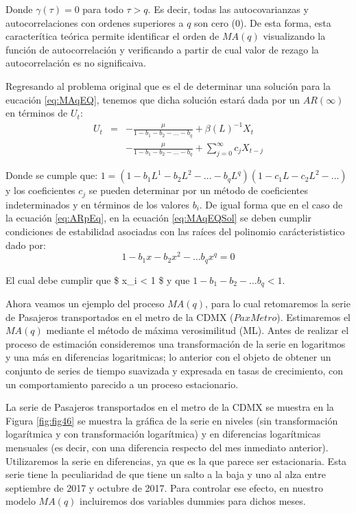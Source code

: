 \documentclass[
]{book}
\begin{document}
Donde \(\gamma(\tau) = 0\) para todo \(\tau > q\). Es decir, todas las autocovarianzas y autocorrelaciones con ordenes superiores a \(q\) son cero (0). De esta forma, esta caracterítica teórica permite identificar el orden de \(MA(q)\) visualizando la función de autocorrelación y verificando a partir de cual valor de rezago la autocorrelación es no significaiva.

Regresando al problema original que es el de determinar una solución para la eucación \eqref{eq:MAqEQ}, tenemos que dicha solución estará dada por un \(AR(\infty)\) en términos de \(U_t\):
\begin{eqnarray}
    U_t & = & - \frac{\mu}{1 - b_1 - b_2 - \ldots - b_q} + \beta(L)^{-1} X_t \nonumber \\
    &   & - \frac{\mu}{1 - b_1 - b_2 - \ldots - b_q} + \sum_{j = 0}^{\infty} c_j X_{t-j} 
    \label{eq:MAqEQSol}
\end{eqnarray}

Donde se cumple que: \(1 = (1 - b_1 L^1 - b_2 L^2 - \ldots - b_q L^q)(1 - c_1 L - c_2 L^2 - \ldots)\) y los coeficientes \(c_j\) se pueden determinar por un método de coeficientes indeterminados y en términos de los valores \(b_i\). De igual forma que en el caso de la ecuación \eqref{eq:ARpEq}, en la ecuación \eqref{eq:MAqEQSol} se deben cumplir condiciones de estabilidad asociadas con las raíces del polinomio carácterististico dado por:
\begin{equation}
    1 - b_1 x - b_2 x^2 - \ldots b_q x^q = 0
\end{equation}

El cual debe cumplir que \$ \textbar{} x\_i \textbar{} \textless{} 1 \$ y que \(1 - b_1 - b_2 - \ldots b_q < 1\).

Ahora veamos un ejemplo del proceso \(MA(q)\), para lo cual retomaremos la serie de Pasajeros transportados en el metro de la CDMX (\(PaxMetro\)). Estimaremos el \(MA(q)\) mediante el método de máxima verosimilitud (ML). Antes de realizar el proceso de estimación consideremos una transformación de la serie en logaritmos y una más en diferencias logaritmicas; lo anterior con el objeto de obtener un conjunto de series de tiempo suavizada y expresada en tasas de crecimiento, con un comportamiento parecido a un proceso estacionario.

La serie de Pasajeros transportados en el metro de la CDMX se muestra en la Figura \ref{fig:fig46} se muestra la gráfica de la serie en niveles (sin transformación logarítmica y con transformación logarítmica) y en diferencias logarítmicas mensuales (es decir, con una diferencia respecto del mes inmediato anterior). Utilizaremos la serie en diferencias, ya que es la que parece ser estacionaria. Esta serie tiene la peculiaridad de que tiene un salto a la baja y uno al alza entre septiembre de 2017 y octubre de 2017. Para controlar ese efecto, en nuestro modelo \(MA(q)\) incluiremos dos variables dummies para dichos meses.
\end{document}
